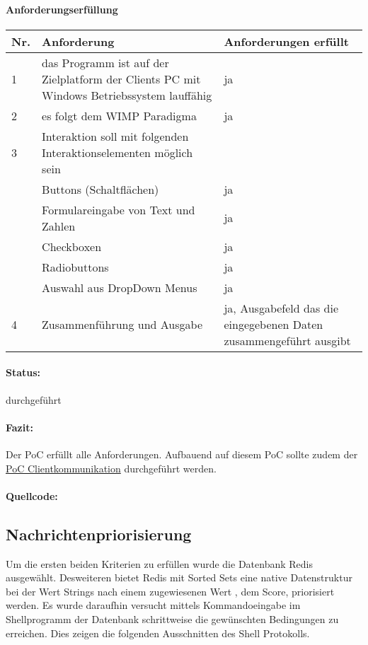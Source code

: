 \documentclass[11pt,oneside,a4paper,notitlepage]{article}
\begin{document}
%
\paragraph*{Anforderungserfüllung}
\begin{center}
\begin{tabular}{| p{20mm} | p{80mm} | p{60mm} |}
\hline
Nr. & Anforderung & Anforderungen erfüllt\\
\hline
1 & das Programm ist auf der Zielplatform der Clients PC mit Windows Betriebssystem lauffähig  & ja\\
\hline
2 & es folgt dem WIMP Paradigma & ja\\
\hline
3 & Interaktion soll mit folgenden Interaktionselementen möglich sein &  \\
 &  Buttons (Schaltflächen) & ja \\
 &  Formulareingabe von Text und Zahlen & ja  \\
 &  Checkboxen & ja \\
 &  Radiobuttons & ja \\
 &  Auswahl aus DropDown Menus & ja \\
\hline
4 & Zusammenführung und Ausgabe  & ja, Ausgabefeld das die eingegebenen Daten zusammengeführt ausgibt \\
\hline
\end{tabular}
\end{center}
%
\paragraph*{Status:} durchgeführt
\paragraph*{Fazit:} Der PoC erfüllt alle Anforderungen. Aufbauend auf diesem PoC sollte zudem der \href{}{PoC Clientkommunikation} durchgeführt werden.
\paragraph*{Quellcode: } \href{}{}

%
%
\subsection{Nachrichtenpriorisierung}
%
Um die ersten beiden Kriterien zu erfüllen wurde die Datenbank Redis ausgewählt. Desweiteren bietet Redis mit Sorted Sets eine native Datenstruktur bei der Wert Strings nach einem zugewiesenen Wert , dem Score, priorisiert werden. Es wurde daraufhin versucht mittels Kommandoeingabe im Shellprogramm der Datenbank schrittweise die gewünschten Bedingungen zu erreichen. Dies zeigen die folgenden Ausschnitten des Shell Protokolls.
\end{document}
